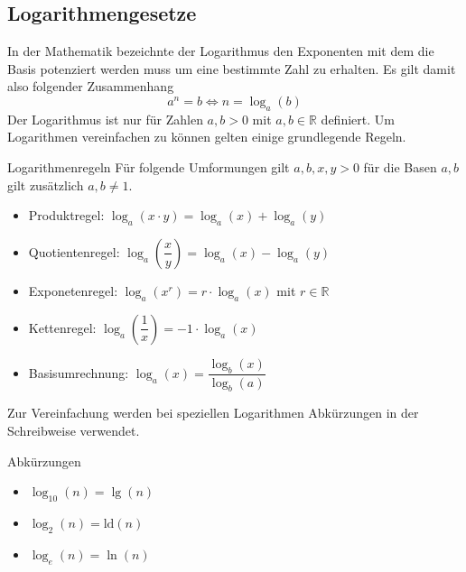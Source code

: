 \subsection{Logarithmengesetze}
In der Mathematik bezeichnte der Logarithmus den Exponenten mit dem die Basis potenziert werden muss um eine bestimmte Zahl zu erhalten. Es gilt damit also folgender Zusammenhang $$a^n = b \Leftrightarrow n = \log_a (b)$$
Der Logarithmus ist nur für Zahlen $a,b>0$ mit $a,b\in\mathds{R}$ definiert. Um Logarithmen vereinfachen zu können gelten einige grundlegende Regeln. 
\begin{merke}{Logarithmenregeln}{}
Für folgende Umformungen gilt $a,b,x,y > 0$ für die Basen $a,b$ gilt zusätzlich $a,b \neq 1$.
\begin{itemize}
    \item Produktregel: $\log_a{(x\cdot y)} = \log_a{(x)} + \log_a{(y)}$
    \item Quotientenregel: $\log_a{\left(\dfrac{x}{y}\right)}= \log_a{(x)} -\log_a{(y)}$
    \item Exponetenregel: $\log_a{(x^r)} = r\cdot \log_a{(x)}$ mit $r\in \mathds{R}$
    \item Kettenregel: $\log_a{\left(\dfrac{1}{x}\right)} = -1\cdot\log_a{(x)}$
    \item Basisumrechnung: $\log_a{(x)} = \dfrac{\log_b{(x)}}{\log_b{(a)}}$
\end{itemize}
\end{merke}
Zur Vereinfachung werden bei speziellen Logarithmen Abkürzungen in der Schreibweise verwendet.
\begin{bem}{Abkürzungen}{}\label{ln}
    \begin{itemize}
        \item $\log_{10}{(n)} = \lg{(n)}$ 
        \item $\log_{2}{(n)} = \text{ld}{(n)}$
        \item $\log_{e}{(n)} = \ln{(n)}$
    \end{itemize}
\end{bem}
